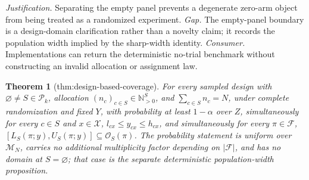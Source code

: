 \documentclass{article}
\newtheorem{theorem}{Theorem}
\begin{document}
\par\smallskip\noindent \textit{Justification.} Separating the empty panel prevents a degenerate zero-arm object from being treated as a randomized experiment. \textit{Gap.} The empty-panel boundary is a design-domain clarification rather than a novelty claim; it records the population width implied by the sharp-width identity. \textit{Consumer.} Implementations can return the deterministic no-trial benchmark without constructing an invalid allocation or assignment law.

\begin{theorem}[thm:design-based-coverage]\label{thm:design-based-coverage}
For every sampled design with \(\varnothing\neq S\in\mathcal P_k\), allocation \((n_c)_{c\in S}\in\mathbb N_{>0}^{S}\), and \(\sum_{c\in S}n_c=N\), under complete randomization and fixed \(Y\), with probability at least \(1-\alpha\) over \(Z\), simultaneously for every \(c\in S\) and \(x\in\mathcal X\), \(l_{cx}\leq y_{cx}\leq h_{cx}\), and simultaneously for every \(\pi\in\mathcal F\), \([L_S(\pi;y),U_S(\pi;y)]\subseteq\mathcal O_S(\pi)\). The probability statement is uniform over \(\mathcal M_N\), carries no additional multiplicity factor depending on \(|\mathcal F|\), and has no domain at \(S=\varnothing\); that case is the separate deterministic population-width proposition.
\end{theorem}
\end{document}
